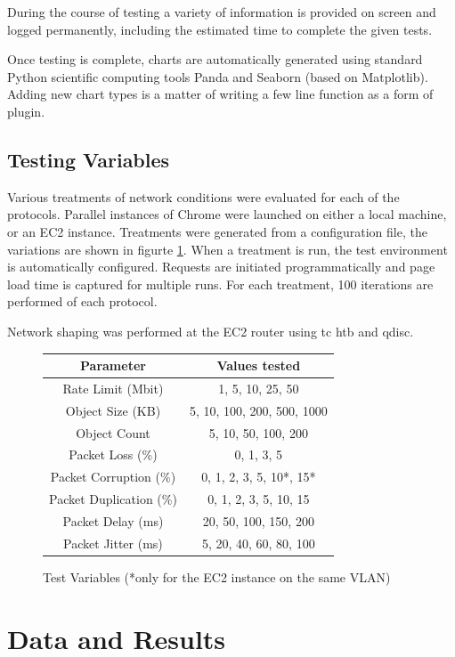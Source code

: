 \documentclass[12pt]{article}
\begin{document}
During the course of testing a variety of information is provided on screen and logged permanently, including the estimated time to complete the given tests.

Once testing is complete, charts are automatically generated using standard Python scientific computing tools Panda and Seaborn (based on Matplotlib). Adding new chart types is a matter of writing a few line function as a form of plugin.

\subsection{Testing Variables}
Various treatments of network conditions were evaluated for each of the protocols. Parallel instances of Chrome were launched on either a local machine, or an EC2 instance. Treatments were generated from a configuration file, the variations are shown in figurte \ref{test_variables}. When a treatment is run, the test environment is automatically configured. Requests are initiated programmatically and page load time is captured for multiple runs. For each treatment, 100 iterations are performed of each protocol.

Network shaping was performed at the EC2 router using tc htb and qdisc.
\begin{figure}
\centering
\begin{tabular}{c|c}
	Parameter	&	Values tested 	\\\hline
	Rate Limit (Mbit) 	&	1, 5, 10, 25, 50	\\
	Object Size (KB)	&	5, 10, 100, 200, 500, 1000	\\
	Object Count &	5, 10, 50, 100, 200	\\
	Packet Loss (\%)	&	0, 1, 3, 5	\\
	Packet Corruption (\%) & 0, 1, 2, 3, 5, 10*, 15* \\
	Packet Duplication (\%) & 0, 1, 2, 3, 5, 10, 15 \\
	Packet Delay (ms)		&	20, 50, 100, 150, 200	\\
	Packet Jitter (ms)		& 5, 20, 40, 60, 80, 100 \\
\end{tabular}
\caption{Test Variables (*only for the EC2 instance on the same VLAN)}
\label{test_variables}
\end{figure}

\section{Data and Results}
\label{data_results}
\end{document}
